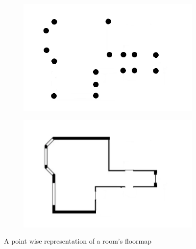 \begin{figure}[htbp]
    \centering
    \begin{subfigure}[b]{0.38\textwidth}
        \centering
        \includegraphics[width=\textwidth]{images/roomonly_points.png}
    \end{subfigure}
    \hfill
    \begin{subfigure}[b]{0.38\textwidth}
        \centering
        \includegraphics[width=\textwidth]{images/roomonly.png}
    \end{subfigure}
    \caption{A point wise representation of a room's floormap}
    \label{fig:pointtomap}
\end{figure}

